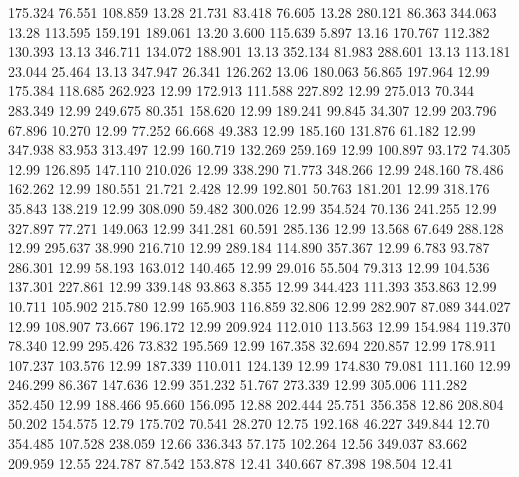  175.324   76.551  108.859        13.28
  21.731   83.418   76.605        13.28
 280.121   86.363  344.063        13.28
 113.595  159.191  189.061        13.20
   3.600  115.639    5.897        13.16
 170.767  112.382  130.393        13.13
 346.711  134.072  188.901        13.13
 352.134   81.983  288.601        13.13
 113.181   23.044   25.464        13.13
 347.947   26.341  126.262        13.06
 180.063   56.865  197.964        12.99
 175.384  118.685  262.923        12.99
 172.913  111.588  227.892        12.99
 275.013   70.344  283.349        12.99
 249.675   80.351  158.620        12.99
 189.241   99.845   34.307        12.99
 203.796   67.896   10.270        12.99
  77.252   66.668   49.383        12.99
 185.160  131.876   61.182        12.99
 347.938   83.953  313.497        12.99
 160.719  132.269  259.169        12.99
 100.897   93.172   74.305        12.99
 126.895  147.110  210.026        12.99
 338.290   71.773  348.266        12.99
 248.160   78.486  162.262        12.99
 180.551   21.721    2.428        12.99
 192.801   50.763  181.201        12.99
 318.176   35.843  138.219        12.99
 308.090   59.482  300.026        12.99
 354.524   70.136  241.255        12.99
 327.897   77.271  149.063        12.99
 341.281   60.591  285.136        12.99
  13.568   67.649  288.128        12.99
 295.637   38.990  216.710        12.99
 289.184  114.890  357.367        12.99
   6.783   93.787  286.301        12.99
  58.193  163.012  140.465        12.99
  29.016   55.504   79.313        12.99
 104.536  137.301  227.861        12.99
 339.148   93.863    8.355        12.99
 344.423  111.393  353.863        12.99
  10.711  105.902  215.780        12.99
 165.903  116.859   32.806        12.99
 282.907   87.089  344.027        12.99
 108.907   73.667  196.172        12.99
 209.924  112.010  113.563        12.99
 154.984  119.370   78.340        12.99
 295.426   73.832  195.569        12.99
 167.358   32.694  220.857        12.99
 178.911  107.237  103.576        12.99
 187.339  110.011  124.139        12.99
 174.830   79.081  111.160        12.99
 246.299   86.367  147.636        12.99
 351.232   51.767  273.339        12.99
 305.006  111.282  352.450        12.99
 188.466   95.660  156.095        12.88
 202.444   25.751  356.358        12.86
 208.804   50.202  154.575        12.79
 175.702   70.541   28.270        12.75
 192.168   46.227  349.844        12.70
 354.485  107.528  238.059        12.66
 336.343   57.175  102.264        12.56
 349.037   83.662  209.959        12.55
 224.787   87.542  153.878        12.41
 340.667   87.398  198.504        12.41
